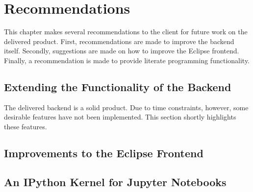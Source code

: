 \chapter{Recommendations} \label{cha:recommendations}

This chapter makes several recommendations to the client for future work on the
delivered product. First, recommendations are made to improve the backend
itself. Secondly, suggestions are made on how to improve the Eclipse frontend.
Finally, a recommendation is made to provide literate programming functionality.

\section{Extending the Functionality of the Backend}
\label{sec:impr-backend}

The delivered backend is a solid product. Due to time constraints, however, some
desirable features have not been implemented. This section shortly highlights
these features.





\section{Improvements to the Eclipse Frontend}
\label{sec:impr-eclipse}



\section{An IPython Kernel for Jupyter Notebooks}
\label{sec:discuss-literate-programming}




